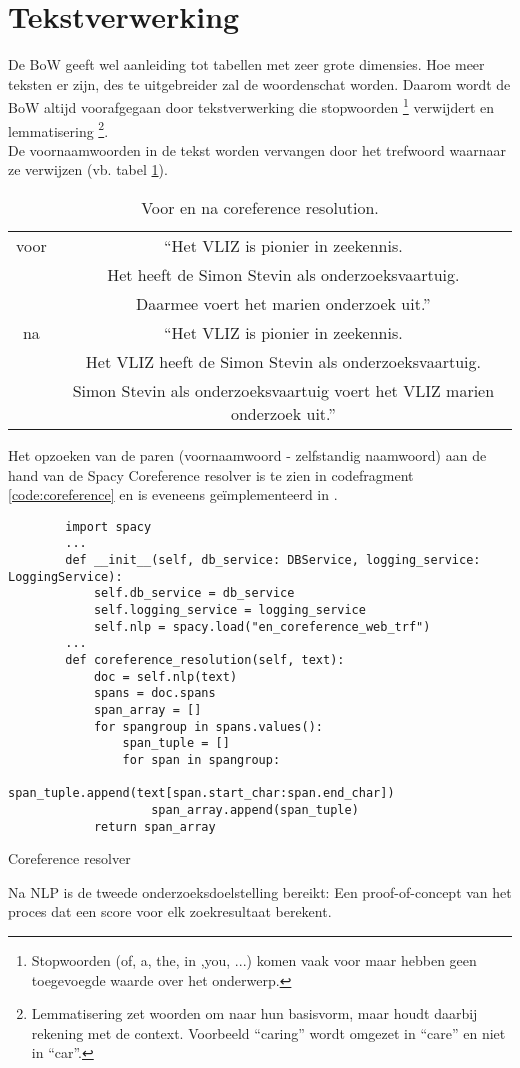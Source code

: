 \section{Tekstverwerking}
De BoW geeft wel aanleiding tot tabellen met zeer grote dimensies. Hoe meer teksten er zijn, des te uitgebreider zal de woordenschat worden. Daarom wordt de BoW altijd voorafgegaan door tekstverwerking die stopwoorden \footnote{Stopwoorden (of, a, the, in ,you, ...) komen vaak voor maar hebben geen toegevoegde waarde over het onderwerp.} verwijdert en lemmatisering \footnote{Lemmatisering zet woorden om naar hun basisvorm, maar houdt daarbij rekening met de context. Voorbeeld ``caring'' wordt omgezet in ``care'' en niet in ``car''.}.\\
De voornaamwoorden in de tekst worden vervangen door het trefwoord waarnaar ze verwijzen (vb. tabel \ref{table:nlp}).
\begin{table}[h!]
    \centering
    \begin{tabular}{|c|c|} 
        \hline
        voor&``Het VLIZ is pionier in zeekennis.\\&Het heeft de Simon Stevin als onderzoeksvaartuig.\\&Daarmee voert het marien onderzoek uit.''\\
        \hline
        na&``Het VLIZ is pionier in zeekennis.\\&Het VLIZ heeft de Simon Stevin als onderzoeksvaartuig.\\&Simon Stevin als onderzoeksvaartuig voert het VLIZ marien onderzoek uit.''\\
        \hline
    \end{tabular}
    \caption{Voor en na coreference resolution.}
    \label{table:nlp}
\end{table}
Het opzoeken van de paren (voornaamwoord - zelfstandig naamwoord) aan de hand van de Spacy Coreference resolver \autocite{Spacy2025} is te zien in codefragment \ref{code:coreference} en is eveneens geïmplementeerd in \textcite{Depaepenlp2025}.\\
\begin{listing}
    \begin{verbatim}
        import spacy
        ...
        def __init__(self, db_service: DBService, logging_service: LoggingService):
            self.db_service = db_service
            self.logging_service = logging_service
            self.nlp = spacy.load("en_coreference_web_trf")
        ...
        def coreference_resolution(self, text):
            doc = self.nlp(text)
            spans = doc.spans
            span_array = []
            for spangroup in spans.values():
                span_tuple = []
                for span in spangroup:
                    span_tuple.append(text[span.start_char:span.end_char])
                    span_array.append(span_tuple)
            return span_array
    \end{verbatim}
    \caption[Coreference resolver]{Coreference resolver}
    \label{code:coreference}
\end{listing}
Na NLP is de tweede onderzoeksdoelstelling bereikt: Een proof-of-concept van het proces dat een score voor elk zoekresultaat berekent.